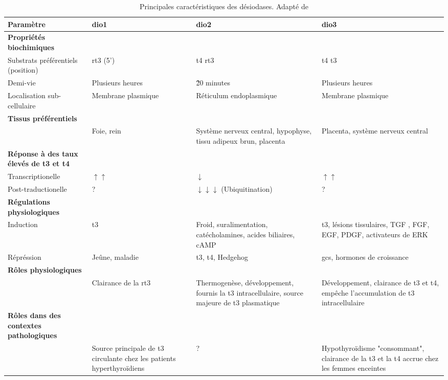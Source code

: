 \begin{sidewaystable}[!htbp]
{
\footnotesize
{}
\begin{tabularx}{\textwidth}{L L L L}

\toprule

\textbf{Paramètre} &
	\textbf{\gls{dio1}} &
	\textbf{\gls{dio2}} &
	\textbf{\gls{dio3}} \\

\midrule

\textbf{Propriétés biochimiques} & ~ & ~ & ~ \\
	Substrats préférentiels (position) &
		\gls{rt3} (5') &
		\gls{t4} \gls{rt3} &
		\gls{t4} \gls{t3} \\
	Demi-vie &
		Plusieurs heures &
		\~ 20 minutes &
		Plusieurs heures \\
	Localisation sub-cellulaire &
		Membrane plasmique &
		Réticulum endoplasmique &
		Membrane plasmique \\
\textbf{Tissus préférentiels} & ~ & ~ & ~ \\
	~ &
		Foie, rein &
		Système nerveux central, hypophyse, tissu adipeux brun, placenta &
		Placenta, système nerveux central \\
\textbf{Réponse à des taux élevés de \gls{t3} et \gls{t4}} & ~ & ~ & ~ \\
	Transcriptionelle &
		$\uparrow \uparrow$ &
		$\downarrow$ &
		$\uparrow \uparrow$ \\
	Post-traductionelle &
		? &
		$\downarrow \downarrow \downarrow$ (Ubiquitination) &
		? \\
\textbf{Régulations physiologiques} & ~ & ~ & ~ \\
	Induction &
		\gls{t3} &
		Froid, suralimentation, catécholamines, acides biliaires, cAMP &
		\gls{t3}, lésions tissulaires, TGF , FGF, EGF, PDGF, activateurs de ERK \\
	Répréssion &
		Jeûne, maladie &
		\gls{t3}, \gls{t4}, Hedgehog &
		\glspl{gc}, hormones de croissance \\
\textbf{Rôles physiologiques} & ~ & ~ & ~ \\
	~ &
		Clairance de la \gls{rt3} &
		Thermogenèse, développement, fournis la \gls{t3} intracellulaire, source majeure de \gls{t3} plasmatique &
		Développement, clairance de \gls{t3} et \gls{t4}, empêche l'accumulation de \gls{t3} intracellulaire \\
\textbf{Rôles dans des contextes pathologiques} & ~ & ~ & ~ \\
	~ &
		Source principale de \gls{t3} circulante chez les patients hyperthyroïdiens &
		? &
		Hypothyroïdisme "consommant", clairance de la \gls{t3} et la \gls{t4} accrue chez les femmes enceintes \\
		
\bottomrule

\end{tabularx}
}
\caption[Principales caractéristiques des désiodases]
{
Principales caractéristiques des désiodases. Adapté de \citet{Bianco2006}
}
\label{tab:desiodases}
\end{sidewaystable}